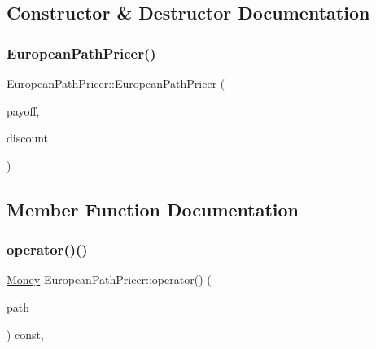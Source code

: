 \subsection{Constructor \& Destructor Documentation}
\hypertarget{class_european_path_pricer_aa571bb1652a0d7e4f97d3d58e7c8b295}{}\label{class_european_path_pricer_aa571bb1652a0d7e4f97d3d58e7c8b295} 
\subsubsection{\texorpdfstring{European\+Path\+Pricer()}{EuropeanPathPricer()}}
{\footnotesize\ttfamily European\+Path\+Pricer\+::\+European\+Path\+Pricer (\begin{DoxyParamCaption}\item[{const std\+::shared\+\_\+ptr$<$ \hyperlink{class_payoff}{Payoff} $>$ \&}]{payoff,  }\item[{\hyperlink{_name_def_8h_a25bee43a162de339c81f3d1caf6b887d}{Rate}}]{discount }\end{DoxyParamCaption})}



\subsection{Member Function Documentation}
\hypertarget{class_european_path_pricer_a879d161eeff532f1f3e2fc5224b3361b}{}\label{class_european_path_pricer_a879d161eeff532f1f3e2fc5224b3361b} 
\subsubsection{\texorpdfstring{operator()()}{operator()()}}
{\footnotesize\ttfamily \hyperlink{_name_def_8h_a5a9d48c16a694e9a2d9f1eca730dc8c5}{Money} European\+Path\+Pricer\+::operator() (\begin{DoxyParamCaption}\item[{const \hyperlink{class_path}{Path}$<$ \hyperlink{struct_single_variate}{Single\+Variate} $>$ \&}]{path }\end{DoxyParamCaption}) const\hspace{0.3cm}{\ttfamily [override]}, {\ttfamily [virtual]}}



